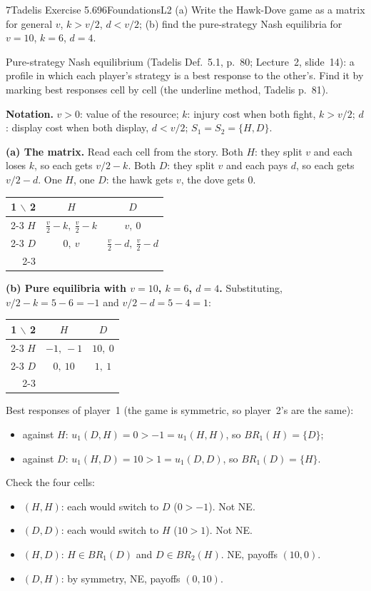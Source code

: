 \begin{exsol}{7}{Tadelis Exercise 5.6}{96}{Foundations}{L2}
\asked (a) Write the Hawk-Dove game as a matrix for general $v$, $k > v/2$, $d < v/2$;
(b) find the pure-strategy Nash equilibria for $v = 10$, $k = 6$, $d = 4$.

\method Pure-strategy Nash equilibrium (Tadelis Def.~5.1, p.~80; Lecture~2, slide~14): a profile
in which each player's strategy is a best response to the other's. Find it by marking best
responses cell by cell (the underline method, Tadelis p.~81).

\solution
\textbf{Notation.} $v > 0$: value of the resource; $k$: injury cost when both fight, $k > v/2$;
$d$: display cost when both display, $d < v/2$; $S_1 = S_2 = \{H, D\}$.

\textbf{(a) The matrix.} Read each cell from the story. Both $H$: they split $v$ and each loses
$k$, so each gets $v/2 - k$. Both $D$: they split $v$ and each pays $d$, so each gets $v/2 - d$.
One $H$, one $D$: the hawk gets $v$, the dove gets $0$.
\begin{center}
\begin{tabular}{r|c|c|}
\multicolumn{1}{r}{1 $\backslash$ 2} & \multicolumn{1}{c}{$H$} & \multicolumn{1}{c}{$D$}\\ \cline{2-3}
$H$ & $\frac v2 - k,\ \frac v2 - k$ & $v,\ 0$ \\ \cline{2-3}
$D$ & $0,\ v$ & $\frac v2 - d,\ \frac v2 - d$ \\ \cline{2-3}
\end{tabular}
\end{center}

\textbf{(b) Pure equilibria with $v = 10$, $k = 6$, $d = 4$.} Substituting,
$v/2 - k = 5 - 6 = -1$ and $v/2 - d = 5 - 4 = 1$:
\begin{center}
\begin{tabular}{r|c|c|}
\multicolumn{1}{r}{1 $\backslash$ 2} & \multicolumn{1}{c}{$H$} & \multicolumn{1}{c}{$D$}\\ \cline{2-3}
$H$ & $-1,\ -1$ & $10,\ 0$ \\ \cline{2-3}
$D$ & $0,\ 10$ & $1,\ 1$ \\ \cline{2-3}
\end{tabular}
\end{center}
Best responses of player~1 (the game is symmetric, so player~2's are the same):
\begin{itemize}
  \item against $H$: $u_1(D,H) = 0 > -1 = u_1(H,H)$, so $BR_1(H) = \{D\}$;
  \item against $D$: $u_1(H,D) = 10 > 1 = u_1(D,D)$, so $BR_1(D) = \{H\}$.
\end{itemize}
Check the four cells:
\begin{itemize}
  \item $(H,H)$: each would switch to $D$ ($0 > -1$). Not NE.
  \item $(D,D)$: each would switch to $H$ ($10 > 1$). Not NE.
  \item $(H,D)$: $H \in BR_1(D)$ and $D \in BR_2(H)$. NE, payoffs $(10, 0)$.
  \item $(D,H)$: by symmetry, NE, payoffs $(0, 10)$.
\end{itemize}


\end{exsol}
